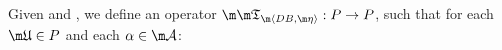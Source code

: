 \begin{definition} \label{def:apfull}
Given \db and \aics, we define an operator $\Apfull: P\to P$, such that for each $\UUU\in P$ and each $\alpha \in\acts$:

% 
% 
% 
% 
% 
% 
% 	
% 

\end{definition}
